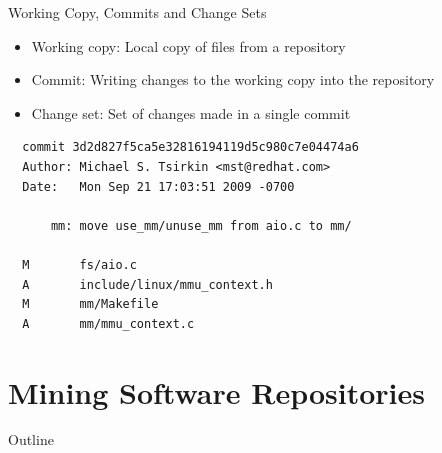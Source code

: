 \begin{frame}[containsverbatim]{Working Copy, Commits and Change Sets}
  \begin{itemize}
  \item Working copy: Local copy of files from a repository
  \item Commit: Writing changes to the working copy into the
    repository
  \item Change set: Set of changes made in a single commit
  \end{itemize}


\begin{verbatim}
  commit 3d2d827f5ca5e32816194119d5c980c7e04474a6
  Author: Michael S. Tsirkin <mst@redhat.com>
  Date:   Mon Sep 21 17:03:51 2009 -0700

      mm: move use_mm/unuse_mm from aio.c to mm/

  M       fs/aio.c
  A       include/linux/mmu_context.h
  M       mm/Makefile
  A       mm/mmu_context.c
\end{verbatim}
\end{frame}



\section{Mining Software Repositories}

\begin{frame}{Outline}
  \tableofcontents[current]
\end{frame}

\note{
}

